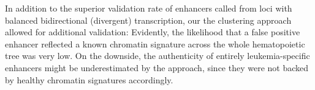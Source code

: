 In addition to the superior validation rate of enhancers called from loci with balanced bidirectional (divergent) transcription\cite{Andersson2014,Nagari2017}, our the clustering approach allowed for additional validation: Evidently, the likelihood that a false positive enhancer reflected a known chromatin signature across the whole hematopoietic tree was very low. On the downside, the authenticity of entirely leukemia-specific enhancers might be underestimated by the approach, since they were not backed by healthy chromatin signatures accordingly.